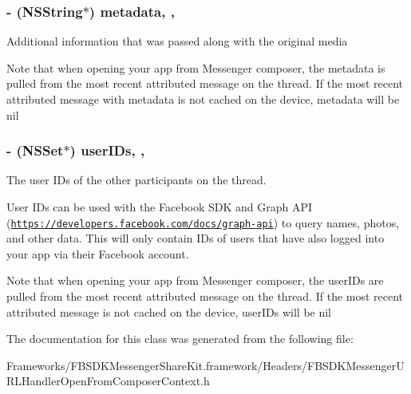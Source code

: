 \subsubsection[{metadata}]{\setlength{\rightskip}{0pt plus 5cm}-\/ (N\+S\+String$\ast$) metadata\hspace{0.3cm}{\ttfamily [read]}, {\ttfamily [nonatomic]}, {\ttfamily [copy]}}\label{interface_f_b_s_d_k_messenger_u_r_l_handler_open_from_composer_context_ae506afbcd01aff6b1ba765aa865307e2}
Additional information that was passed along with the original media

Note that when opening your app from Messenger composer, the metadata is pulled from the most recent attributed message on the thread. If the most recent attributed message with metadata is not cached on the device, metadata will be nil \hypertarget{interface_f_b_s_d_k_messenger_u_r_l_handler_open_from_composer_context_aec97bc39429cab5358c3020ad5edd125}{}
\subsubsection[{user\+I\+Ds}]{\setlength{\rightskip}{0pt plus 5cm}-\/ (N\+S\+Set$\ast$) user\+I\+Ds\hspace{0.3cm}{\ttfamily [read]}, {\ttfamily [nonatomic]}, {\ttfamily [copy]}}\label{interface_f_b_s_d_k_messenger_u_r_l_handler_open_from_composer_context_aec97bc39429cab5358c3020ad5edd125}
The user I\+Ds of the other participants on the thread.

User I\+Ds can be used with the Facebook S\+D\+K and Graph A\+P\+I (\href{https://developers.facebook.com/docs/graph-api}{\tt https\+://developers.\+facebook.\+com/docs/graph-\/api}) to query names, photos, and other data. This will only contain I\+Ds of users that have also logged into your app via their Facebook account.

Note that when opening your app from Messenger composer, the user\+I\+Ds are pulled from the most recent attributed message on the thread. If the most recent attributed message is not cached on the device, user\+I\+Ds will be nil 

The documentation for this class was generated from the following file\+:\begin{DoxyCompactItemize}
\item 
Frameworks/\+F\+B\+S\+D\+K\+Messenger\+Share\+Kit.\+framework/\+Headers/F\+B\+S\+D\+K\+Messenger\+U\+R\+L\+Handler\+Open\+From\+Composer\+Context.\+h\end{DoxyCompactItemize}
